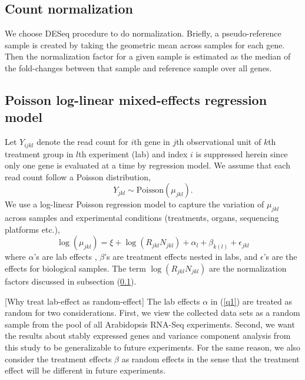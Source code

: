 \documentclass[11pt, a4paper]{article}
\begin{document}
\subsection{Count normalization}\label{countNormalization}
We choose DESeq  procedure \citep{anders2010differential} to do normalization.  Briefly, a pseudo-reference sample is created by taking the geometric mean across samples for each gene. Then the normalization factor for a given sample is estimated as the median of the fold-changes between that sample and reference sample over all genes.

\subsection{Poisson log-linear mixed-effects regression model} 

Let $Y_{ijkl}$ denote the read count for $i$th gene
in $j$th observational unit of $k$th treatment group in $l$th experiment (lab)
and index $i$ is suppressed herein since only one gene is evaluated at a time
by regression model. We assume that each read count follow a Poisson
distribution,  
\[Y_{jkl}\sim \text{Poisson}(\mu_{jkl}).\] 
We use a log-linear Poisson regression model to capture 
the variation of $\mu_{jkl}$ across samples and experimental conditions (treatments,
organs, sequencing platforms etc.),
\begin{equation}\label{q1}
    \log( \mu_{jkl}) = \xi + \log(R_{jkl}N_{jkl})+ \alpha_l + \beta_{k(l)} + \epsilon_{jkl} 
\end{equation}
where $\alpha$'s are lab effects ,  $\beta$'s are treatment effects
nested in labs, and $\epsilon$'s are the effects for biological samples. 
The term $\log(R_{jkl}N_{jkl})$ are the normalization factors discussed in
subsection (\ref{countNormalization}).

[Why treat lab-effect as random-effect] The lab effects $\alpha$ in (\ref{q1}) are treated as random for two considerations. First, we view the collected data sets as a random sample from the pool of all
Arabidopsis RNA-Seq experiments. Second, we want the results about stably expressed genes and variance component analysis from this study to be generalizable to future experiments.
For the same reason, we also consider the treatment effects $\beta$ as random effects
in the sense that the treatment effect will be different in future experiments.
\end{document}

